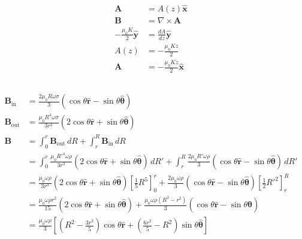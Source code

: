 \documentclass{article}
\renewcommand{\vec}[1]{\boldsymbol{\mathbf{#1}}}
\newcommand{\uvec}[1]{\hat{\vec{#1}}}
\begin{document}
\subsection{}

\begin{align*}
  \vec{A}                     & = A(z) \uvec{x}                 \\
  \vec{B}                     & = \nabla \times \vec{A}         \\
  -\frac{\mu_0 K}{2} \uvec{y} & = \frac{d A}{d z} \uvec{y}      \\
  A(z)                        & = -\frac{\mu_0 K z}{2}          \\
  \vec{A}                     & = -\frac{\mu_0 K z}{2} \uvec{x}
\end{align*}

\setcounter{subsection}{29}
\subsection{}

\begin{align*}
  \vec{B}_\text{in}  & = \frac{2 \mu_0 R \omega \sigma}{3} (\cos \theta \uvec{r} - \sin \theta \uvec{\theta})                                                                                                                                                           \\
  \vec{B}_\text{out} & = \frac{\mu_0 R^4 \omega \sigma}{3 r^3} (2 \cos \theta \uvec{r} + \sin \theta \uvec{\theta})                                                                                                                                                     \\
  \vec{B}            & = \int_0^r \vec{B}_\text{out} \,d R + \int_r^R \vec{B}_\text{in} \,d R                                                                                                                                                                           \\
                     & = \int_0^r \frac{\mu_0 R'^4 \omega \rho}{3 r^3} (2 \cos \theta \uvec{r} + \sin \theta \uvec{\theta}) \,d R' + \int_r^R \frac{2 \mu_0 R' \omega \rho}{3} (\cos \theta \uvec{r} - \sin \theta \uvec{\theta}) \,d R'                                \\
                     & = \frac{\mu_0 \omega \rho}{3 r^3} (2 \cos \theta \uvec{r} + \sin \theta \uvec{\theta}) \left[ \frac{1}{5} R^5 \right]_0^r + \frac{2 \mu_0 \omega \rho}{3} (\cos \theta \uvec{r} - \sin \theta \uvec{\theta}) \left[ \frac{1}{2} R'^2 \right]_r^R \\
                     & = \frac{\mu_0 \omega \rho r^2}{15} (2 \cos \theta \uvec{r} + \sin \theta \uvec{\theta}) + \frac{\mu_0 \omega \rho (R^2 - r^2)}{3} (\cos \theta \uvec{r} - \sin \theta \uvec{\theta})                                                             \\
                     & = \frac{\mu_0 \omega \rho}{3} \left[ \left( R^2 - \frac{3 r^2}{5} \right) \cos \theta \uvec{r} + \left( \frac{6 r^2}{5} - R^2 \right) \sin \theta \uvec{\theta} \right]
\end{align*}
\end{document}

